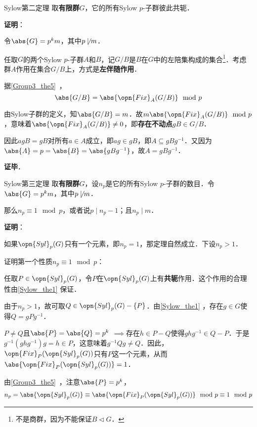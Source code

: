 \begin{theorem}{Sylow第二定理}\label{Sylow_the1}
取\textbf{有限群}$G$，它的所有Sylow $p$-子群彼此共轭．
\end{theorem}

\textbf{证明}：

令$\abs{G}=p^km$，其中$p\not\mid m$．

任取$G$的两个Sylow $p$-子群$A$和$B$，记$G/B$是$B$在$G$中的左陪集构成的集合\footnote{不是商群，因为不能保证$B\vartriangleleft G$．}．考虑群$A$作用在集合$G/B$上，方式是\textbf{左伴随作用}．

据\autoref{Group3_the5}~，
\begin{equation}
\abs{G/B} = \abs{\opn{Fix}_A(G/B)} \mod p
\end{equation}

由Sylow子群的定义，知$\abs{G/B}=m$．故$m\abs{\opn{Fix}_A(G/B)} \mod p$，意味着$\abs{\opn{Fix}_A(G/B)}\neq 0$，即\textbf{存在不动点}$gB\in G/B$．

因此$agB=gB$对所有$a\in A$成立，即$ag\in gB$，即$A\subseteq gBg^{-1}$．又因为$\abs{A}=p=\abs{B}=\abs{gBg^{-1}}$，故$A=gBg^{-1}$．


\textbf{证毕}．




\begin{theorem}{Sylow第三定理}\label{Sylow_the2}
取\textbf{有限群}$G$，设$n_p$是它的所有Sylow $p$-子群的数目．令$\abs{G}=p^km$，其中$p\not\mid m$．

那么$n_p\equiv 1\mod p$，或者说$p\mid n_p-1$；且$n_p\mid m$．
\end{theorem}

\textbf{证明}：

如果$\opn{Syl}_p(G)$只有一个元素，即$n_p=1$，那定理自然成立．下设$n_p>1$．


证明第一个性质$n_p\equiv 1\mod p$：

任取$P\in\opn{Syl}_p(G)$，令$P$在$\opn{Syl}_p(G)$上有\textbf{共轭}作用．这个作用的合理性由\autoref{Sylow_the1} 保证．

由于$n_p>1$，故可取$Q\in \opn{Syl}_p(G)-\{P\}$．由\autoref{Sylow_the1} ，存在$g\in G$使得$Q=gPg^{-1}$．

$P\neq Q$且$\abs{P}=\abs{Q}=p^k$ $\implies$存在$h\in P-Q$使得$ghg^{-1}\in Q-P$．于是$g^{-1}(ghg^{-1})g=h\in P$，这意味着$g^{-1}Qg\neq Q$．因此，$\opn{Fix}_P(\opn{Syl}_p(G))$只有$P$这一个元素，从而$\abs{\opn{Fix}_P(\opn{Syl}_p(G))}=1$．

由\autoref{Group3_the5}~，注意$\abs{P}=p^k$，
\begin{equation}\label{Sylow_eq1}
\begin{aligned}
n_p=\abs{\opn{Syl}_p(G)}\equiv\abs{\opn{Fix}_P(\opn{Syl}_p(G))}\mod p\equiv 1\mod p
\end{aligned}
\end{equation}


